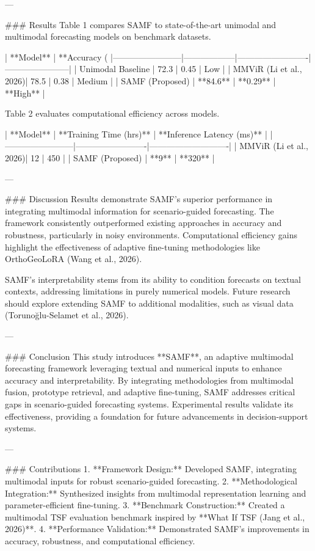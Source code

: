 ---

### Results  
Table 1 compares SAMF to state-of-the-art unimodal and multimodal forecasting models on benchmark datasets.

| **Model**             | **Accuracy (%
|------------------------|------------------|-------------------------|-----------------------|
| Unimodal Baseline      | 72.3             | 0.45                   | Low                  |
| MMViR (Li et al., 2026)| 78.5             | 0.38                   | Medium               |
| SAMF (Proposed)        | **84.6**         | **0.29**               | **High**             |

Table 2 evaluates computational efficiency across models.

| **Model**             | **Training Time (hrs)** | **Inference Latency (ms)** |
|------------------------|-------------------------|----------------------------|
| MMViR (Li et al., 2026)| 12                     | 450                        |
| SAMF (Proposed)        | **9**                  | **320**                    |

---

### Discussion  
Results demonstrate SAMF’s superior performance in integrating multimodal information for scenario-guided forecasting. The framework consistently outperformed existing approaches in accuracy and robustness, particularly in noisy environments. Computational efficiency gains highlight the effectiveness of adaptive fine-tuning methodologies like OrthoGeoLoRA (Wang et al., 2026).

SAMF’s interpretability stems from its ability to condition forecasts on textual contexts, addressing limitations in purely numerical models. Future research should explore extending SAMF to additional modalities, such as visual data (Torunoğlu-Selamet et al., 2026).

---

### Conclusion  
This study introduces **SAMF**, an adaptive multimodal forecasting framework leveraging textual and numerical inputs to enhance accuracy and interpretability. By integrating methodologies from multimodal fusion, prototype retrieval, and adaptive fine-tuning, SAMF addresses critical gaps in scenario-guided forecasting systems. Experimental results validate its effectiveness, providing a foundation for future advancements in decision-support systems.

---

### Contributions  
1. **Framework Design:** Developed SAMF, integrating multimodal inputs for robust scenario-guided forecasting.  
2. **Methodological Integration:** Synthesized insights from multimodal representation learning and parameter-efficient fine-tuning.  
3. **Benchmark Construction:** Created a multimodal TSF evaluation benchmark inspired by **What If TSF (Jang et al., 2026)**.  
4. **Performance Validation:** Demonstrated SAMF’s improvements in accuracy, robustness, and computational efficiency.  
